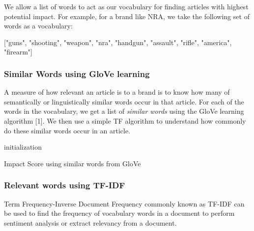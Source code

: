 \documentclass{article}
\begin{document}
We allow a list of words to act as our vocabulary for finding articles with highest potential impact. For example, for a brand like NRA, we take the following set of words as a vocabulary:
\begin{center}
["guns", "shooting", "weapon", "nra", "handgun", "assault", "rifle", "america", "firearm"]
\end {center}

\subsubsection {Similar Words using GloVe learning}
A measure of how relevant an article is to a brand is to know how many of semantically or linguistically similar words occur in that article. For each of the words in the vocabulary, we get a list of \textit{similar words} using the GloVe learning algorithm [1]. We then use a simple TF algorithm to understand how commonly do these similar words occur in an article. 

\begin{center}
\begin{algorithm}[H]
\SetAlgoLined
 initialization\;
 \caption{Impact Score using similar words from GloVe }
\end{algorithm}
\end{center}

\subsubsection {Relevant words using TF-IDF}

Term Frequency-Inverse Document Frequency commonly known as TF-IDF can be used to find the frequency of vocabulary words in a document to perform sentiment analysis or extract relevancy from a document.
\end{document}
